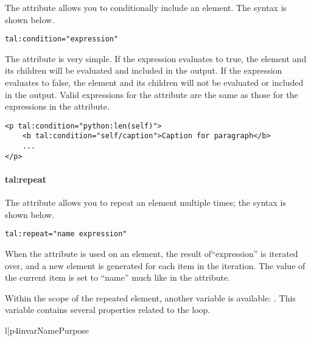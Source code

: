 The  attribute allows you to conditionally include
an element.  The syntax is shown below.
\begin{verbatim}
tal:condition="expression"
\end{verbatim}

The  attribute is very simple.  If the expression
evaluates to true, the element and its children will be evaluated and 
included in the output.  If the expression evaluates to false, the element 
and its children will not be evaluated or included in the output.
Valid expressions for the  attribute are the same 
as those for the expressions in the  attribute.
\begin{verbatim}
<p tal:condition="python:len(self)">
    <b tal:condition="self/caption">Caption for paragraph</b>
    ...
</p>
\end{verbatim}


\paragraph{tal:repeat\label{sec:talrepeat}}

The  attribute allows you to repeat an element multiple 
times; the syntax is shown below.
\begin{verbatim}
tal:repeat="name expression"
\end{verbatim}

When the  attribute is used on an element, the
result of``expression'' is iterated over, and a new element is generated
for each item in the iteration.  The value of the current item is
set to ``name'' much like in the  attribute.

Within the scope of the repeated element, another variable is available:
.  This variable contains several properties related to
the loop.  
\begin{tableii}{l|p{4in}}{var}{Name}{Purpose}
\end{tableii}

